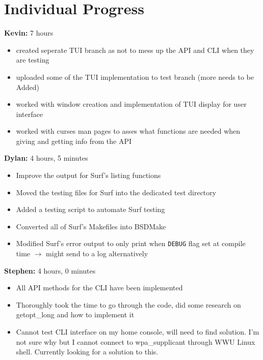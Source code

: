\documentclass[11pt]{article}
\begin{document}
\newpage
\section{Individual Progress}

\textbf{Kevin:} 7 hours
\begin{itemize}
  \item created seperate TUI branch as not to mess up the API and CLI when they are testing
  \item uploaded some of the TUI implementation to test branch (more needs to be Added)
  \item worked with window creation and implementation of TUI display for user interface
  \item worked with curses man pages to asses what functions are needed when giving and getting info from the API
\end{itemize}

\textbf{Dylan:} 4 hours, 5 minutes
\begin{itemize}
  \item Improve the output for Surf's listing functions
  \item Moved the testing files for Surf into the dedicated test directory
  \item Added a testing script to automate Surf testing
  \item Converted all of Surf's Makefiles into BSDMake
  \item Modified Surf's error output to only print when \texttt{DEBUG} flag set
    at compile time $\rightarrow$ might send to a log alternatively
\end{itemize}

\textbf{Stephen:} 4 hours, 0 minutes 
\begin{itemize}
  \item All API methods for the CLI have been implemented 
  \item Thoroughly took the time to go through the code, did some research on getopt\_long
	and how to implement it
  \item Cannot test CLI interface on my home console, will need to find solution. I'm not 
	sure why but I cannot connect to wpa\_supplicant through WWU Linux shell. Currently 
	looking for a solution to this. 
\end{itemize}
\end{document}
